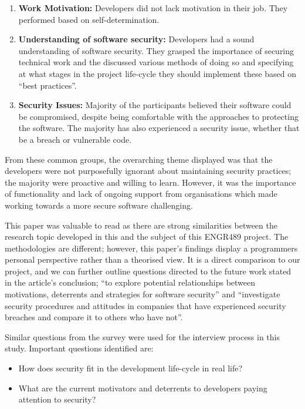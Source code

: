\begin{enumerate}
\item \textbf{Work Motivation:} Developers did not lack motivation in their job. They performed based on self-determination.
\item \textbf{Understanding of software security:} Developers had a sound understanding of software security. They grasped the importance of securing technical work and the discussed various methods of doing so and specifying at what stages in the project life-cycle they should implement these based on “best practices”.
\item \textbf{Security Issues:} Majority of the participants believed their software could be compromised, despite being comfortable with the approaches to protecting the software. The majority has also experienced a security issue, whether that be a breach or vulnerable code.
\end{enumerate}

\par From these common groups, the overarching theme displayed was that the developers were not purposefully ignorant about maintaining security practices; the majority were proactive and willing to learn. However, it was the importance of functionality and lack of ongoing support from organisations which made working towards a more secure software challenging. 
\newline
\par This paper was valuable to read as there are strong similarities between the research topic developed in this and the subject of this ENGR489 project. The methodologies are different; however, this paper's findings display a programmers personal perspective rather than a theorised view. It is a direct comparison to our project, and we can further outline questions directed to the future work stated in the article’s conclusion; “to explore potential relationships between motivations, deterrents and strategies for software security” and “investigate security procedures and attitudes in companies that have experienced security breaches and compare it to others who have not”. 
\newline
\par Similar questions from the survey were used for the interview process in this study. Important questions identified are:

\begin{itemize}
\item How does security fit in the development life-cycle in real life? 
\item What are the current motivators and deterrents to developers paying attention to security? 
\end{itemize}

